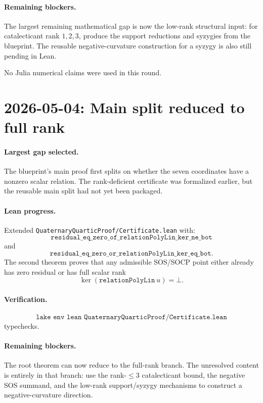 \documentclass[11pt]{article}
\begin{document}
\paragraph{Remaining blockers.}
The largest remaining mathematical gap is now the low-rank structural input:
for catalecticant rank \(1,2,3\), produce the support reductions and syzygies
from the blueprint.  The reusable negative-curvature construction for a
syzygy is also still pending in Lean.

No Julia numerical claims were used in this round.

\section*{2026-05-04: Main split reduced to full rank}

\paragraph{Largest gap selected.}
The blueprint's main proof first splits on whether the seven coordinates have
a nonzero scalar relation.  The rank-deficient certificate was formalized
earlier, but the reusable main split had not yet been packaged.

\paragraph{Lean progress.}
Extended \texttt{QuaternaryQuarticProof/Certificate.lean} with:
\[
\texttt{residual\_eq\_zero\_of\_relationPolyLin\_ker\_ne\_bot}
\]
and
\[
\texttt{residual\_eq\_zero\_or\_relationPolyLin\_ker\_eq\_bot}.
\]
The second theorem proves that any admissible SOS/SOCP point either already
has zero residual or has full scalar rank
\[
\ker(\texttt{relationPolyLin}\ u)=\bot.
\]

\paragraph{Verification.}
\[
\texttt{lake env lean QuaternaryQuarticProof/Certificate.lean}
\]
typechecks.

\paragraph{Remaining blockers.}
The root theorem can now reduce to the full-rank branch.  The unresolved
content is entirely in that branch: use the rank-\(\le3\) catalecticant bound,
the negative SOS summand, and the low-rank support/syzygy mechanisms to
construct a negative-curvature direction.
\end{document}

